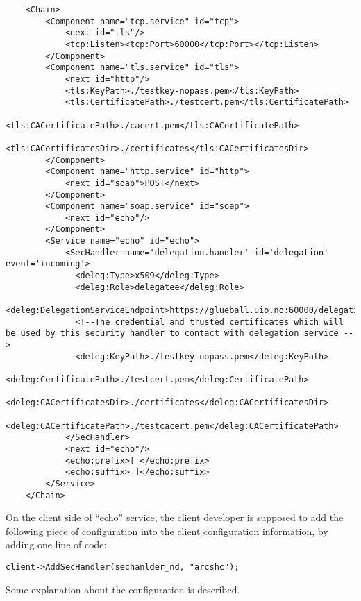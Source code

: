 \documentclass{book}
\begin{document}
\begin{verbatim}
    <Chain>
        <Component name="tcp.service" id="tcp"> 
            <next id="tls"/> 
            <tcp:Listen><tcp:Port>60000</tcp:Port></tcp:Listen> 
        </Component> 
        <Component name="tls.service" id="tls"> 
            <next id="http"/> 
            <tls:KeyPath>./testkey-nopass.pem</tls:KeyPath> 
            <tls:CertificatePath>./testcert.pem</tls:CertificatePath> 
            <tls:CACertificatePath>./cacert.pem</tls:CACertificatePath> 
              <tls:CACertificatesDir>./certificates</tls:CACertificatesDir> 
        </Component> 
        <Component name="http.service" id="http"> 
            <next id="soap">POST</next> 
        </Component> 
        <Component name="soap.service" id="soap"> 
            <next id="echo"/> 
        </Component> 
        <Service name="echo" id="echo"> 
            <SecHandler name='delegation.handler' id='delegation' event='incoming'> 
              <deleg:Type>x509</deleg:Type> 
              <deleg:Role>delegatee</deleg:Role> 
              <deleg:DelegationServiceEndpoint>https://glueball.uio.no:60000/delegation</deleg:DelegationServiceEndpoint> 
              <!--The credential and trusted certificates which will be used by this security handler to contact with delegation service -->
              <deleg:KeyPath>./testkey-nopass.pem</deleg:KeyPath> 
              <deleg:CertificatePath>./testcert.pem</deleg:CertificatePath> 
              <deleg:CACertificatesDir>./certificates</deleg:CACertificatesDir> 
              <deleg:CACertificatePath>./testcacert.pem</deleg:CACertificatePath> 
            </SecHandler> 
            <next id="echo"/> 
            <echo:prefix>[ </echo:prefix> 
            <echo:suffix> ]</echo:suffix> 
        </Service> 
    </Chain> 
\end{verbatim}

On the client side of ``echo'' service, the client developer is supposed to add the following piece of configuration into the client configuration information, by adding one line of code:

\begin{verbatim}
client->AddSecHandler(sechanlder_nd, "arcshc");
\end{verbatim}

Some explanation about the configuration is described.
\end{document}

